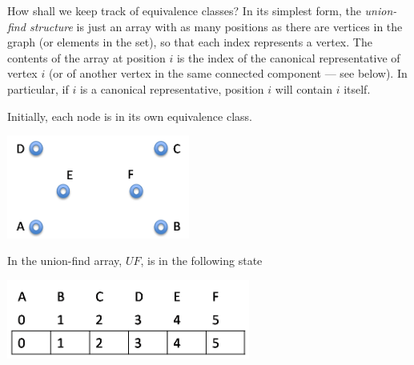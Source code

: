 How shall we keep track of equivalence classes?  In its simplest form,
the \emph{union-find structure} is just an array with as many
positions as there are vertices in the graph (or elements in the set),
so that each index represents a vertex.  The contents of the array at
position $i$ is the index of the canonical representative of vertex
$i$ (or of another vertex in the same connected component --- see
below).  In particular, if $i$ is a canonical representative, position
$i$ will contain $i$ itself.

Initially, each node is in its own equivalence class.
\begin{center}
  \includegraphics[width=0.45\textwidth]{img/forest0.png}
\end{center}
In the union-find array, $\mathit{UF}$, is in the following state
\begin{center}
  \includegraphics[width=0.6\textwidth]{img/ufs0.png}
\end{center}

